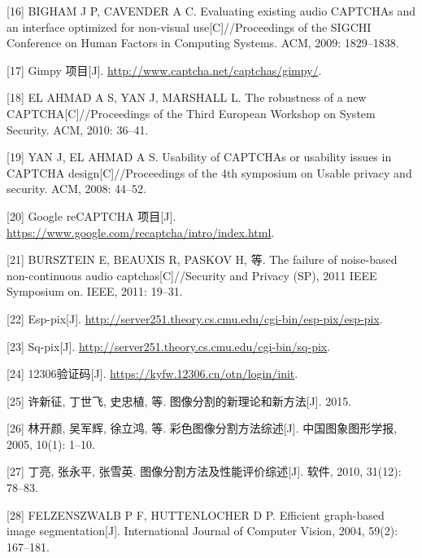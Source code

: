 \documentclass[bachelor,zhspacing]{cqu}  %
\begin{document}
\hypertarget{ref-bigham2009evaluating}{}
{[}16{]} BIGHAM J P, CAVENDER A C. Evaluating existing audio CAPTCHAs
and an interface optimized for non-visual use{[}C{]}//Proceedings of the
SIGCHI Conference on Human Factors in Computing Systems. ACM, 2009:
1829--1838.

\hypertarget{ref-gimpy}{}
{[}17{]} Gimpy 项目{[}J{]}.
\url{http://www.captcha.net/captchas/gimpy/}.

\hypertarget{ref-el2010robustness}{}
{[}18{]} EL AHMAD A S, YAN J, MARSHALL L. The robustness of a new
CAPTCHA{[}C{]}//Proceedings of the Third European Workshop on System
Security. ACM, 2010: 36--41.

\hypertarget{ref-yan2008usability}{}
{[}19{]} YAN J, EL AHMAD A S. Usability of CAPTCHAs or usability issues
in CAPTCHA design{[}C{]}//Proceedings of the 4th symposium on Usable
privacy and security. ACM, 2008: 44--52.

\hypertarget{ref-googlerecaptcha}{}
{[}20{]} Google reCAPTCHA 项目{[}J{]}.
\url{https://www.google.com/recaptcha/intro/index.html}.

\hypertarget{ref-bursztein2011failure}{}
{[}21{]} BURSZTEIN E, BEAUXIS R, PASKOV H, 等. The failure of
noise-based non-continuous audio captchas{[}C{]}//Security and Privacy
(SP), 2011 IEEE Symposium on. IEEE, 2011: 19--31.

\hypertarget{ref-esp-pix}{}
{[}22{]} Esp-pix{[}J{]}.
\url{http://server251.theory.cs.cmu.edu/cgi-bin/esp-pix/esp-pix}.

\hypertarget{ref-sq-pix}{}
{[}23{]} Sq-pix{[}J{]}.
\url{http://server251.theory.cs.cmu.edu/cgi-bin/sq-pix}.

\hypertarget{ref-captcha12306}{}
{[}24{]} 12306验证码{[}J{]}. \url{https://kyfw.12306.cn/otn/login/init}.

\hypertarget{ref-ux8bb8ux65b0ux5f812015ux56feux50cfux5206ux5272ux7684ux65b0ux7406ux8bbaux548cux65b0ux65b9ux6cd5}{}
{[}25{]} 许新征, 丁世飞, 史忠植, 等. 图像分割的新理论和新方法{[}J{]}.
2015.

\hypertarget{ref-ux6797ux5f00ux989c2005ux5f69ux8272ux56feux50cfux5206ux5272ux65b9ux6cd5ux7efcux8ff0}{}
{[}26{]} 林开颜, 吴军辉, 徐立鸿, 等. 彩色图像分割方法综述{[}J{]}.
中国图象图形学报, 2005, 10(1): 1--10.

\hypertarget{ref-ux4e01ux4eae2010ux56feux50cfux5206ux5272ux65b9ux6cd5ux53caux6027ux80fdux8bc4ux4ef7ux7efcux8ff0}{}
{[}27{]} 丁亮, 张永平, 张雪英. 图像分割方法及性能评价综述{[}J{]}. 软件,
2010, 31(12): 78--83.

\hypertarget{ref-Felzenszwalb2004}{}
{[}28{]} FELZENSZWALB P F, HUTTENLOCHER D P. Efficient graph-based image
segmentation{[}J{]}. International Journal of Computer Vision, 2004,
59(2): 167--181.
\end{document}
